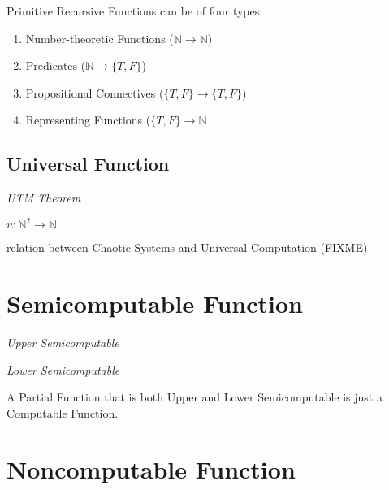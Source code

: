 Primitive Recursive Functions can be of four types: \cite{kleene52}

\begin{enumerate}
\item Number-theoretic Functions ($\mathbb{N} \rightarrow \mathbb{N}$)
\item Predicates ($\mathbb{N} \rightarrow \{T,F\}$)
\item Propositional Connectives ($\{T,F\} \rightarrow \{T,F\}$)
\item Representing Functions ($\{T,F\} \rightarrow \mathbb{N}$
\end{enumerate}



\subsection{Universal Function}\label{sec:universal_function}

\emph{UTM Theorem}

$u : \mathbb{N}^2 \rightarrow \mathbb{N}$

relation between Chaotic Systems and Universal Computation (FIXME)



\section{Semicomputable Function}\label{sec:semicomputable_function}

\emph{Upper Semicomputable}

\emph{Lower Semicomputable}

A Partial Function that is both Upper and Lower Semicomputable is just
a Computable Function.



\section{Noncomputable Function}\label{sec:noncomputable_function}

